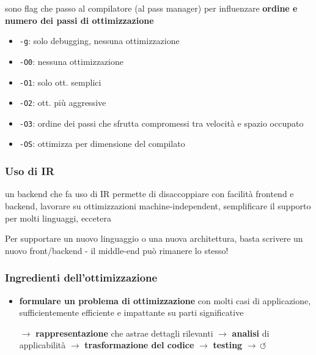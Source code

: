 sono flag che passo al compilatore (al pass manager) per influenzare \textbf{ordine e numero dei passi di ottimizzazione}
\begin{multicols}{2}
  \begin{itemize}
    \item \lstinline|-g|: solo debugging, nessuna ottimizzazione
    \item \lstinline|-O0|: nessuna ottimizzazione
    \item \lstinline|-O1|: solo ott. semplici
    \item \lstinline|-O2|: ott. pi\`u aggressive
    \item \lstinline|-O3|: ordine dei passi che sfrutta compromessi tra velocit\`a e spazio occupato
    \item \lstinline|-OS|: ottimizza per dimensione del compilato
  \end{itemize}
\end{multicols}


\subsubsection{Uso di IR}

un backend che fa uso di IR permette di disaccoppiare con facilit\`a frontend e backend, lavorare su ottimizzazioni machine-independent, semplificare il supporto per molti linguaggi, eccetera

\begin{emphasize}
  Per supportare un nuovo linguaggio o una nuova architettura, basta scrivere un nuovo front/backend - il middle-end pu\`o rimanere lo stesso!
\end{emphasize}

\subsubsection{Ingredienti dell'ottimizzazione}

\begin{itemize}
  \item \textbf{formulare un problema di ottimizzazione} con molti casi di applicazione, sufficientemente efficiente e impattante su parti significative
  \item[$\rightarrow$] \textbf{rappresentazione} che astrae dettagli rilevanti $\rightarrow$ \textbf{analisi} di applicabilit\`a $\rightarrow$ \textbf{trasformazione del codice} $\rightarrow$ \textbf{testing} $\rightarrow \, \circlearrowleft$
\end{itemize}

